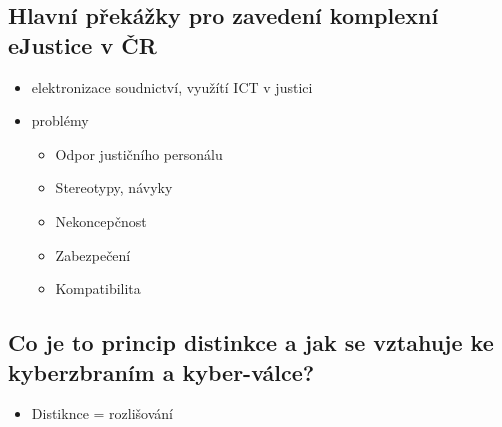 \subsection{Hlavní překážky pro zavedení komplexní eJustice v ČR}
\begin{itemize}
    \item  elektronizace soudnictví, využítí ICT v justici
    \item problémy
    \begin{itemize}
        \item Odpor justičního personálu
        \item Stereotypy, návyky
        \item Nekoncepčnost
        \item Zabezpečení
        \item Kompatibilita

    \end{itemize}
\end{itemize}

\subsection{Co je to princip distinkce a jak se vztahuje ke kyberzbraním a kyber-válce?}
\begin{itemize}
    \item Distiknce = rozlišování
\end{itemize}